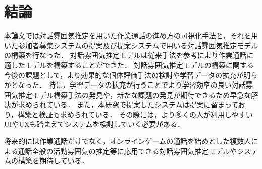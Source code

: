 \chapter{結論\label{sec:conclusion}}
\thispagestyle{plain}

本論文では対話雰囲気推定を用いた作業通話の進め方の可視化手法と，それを用いた参加者募集システムの提案及び提案システムで用いる対話雰囲気推定モデルの構築を行なった．
対話雰囲気推定モデルは従来手法を参考により作業通話に適したモデルを構築することができた．
対話雰囲気推定モデルの構築に関する今後の課題として，より効果的な個体評価手法の検討や学習データの拡充が明らかとなった．
特に，学習データの拡充が行うことでより学習効率の良い対話雰囲気推定モデル構築手法の発見や，新たな課題の発見が期待できるため早急な解決が求められている．
また，本研究で提案したシステムは提案に留まっており，構築と検証も求められている．
その際には，より多くの人が利用しやすいUIやUXも踏まえてシステムを検討していく必要がある．

将来的には作業通話だけでなく，オンラインゲームの通話を始めとした複数人による通話全般の活動雰囲気の推定等に応用できる対話雰囲気推定モデルやシステムの構築を期待している．

